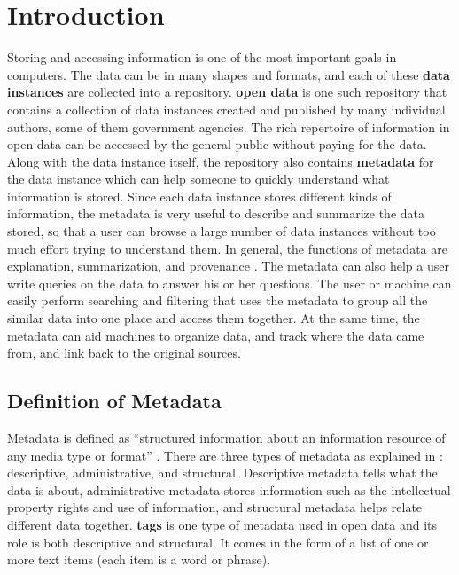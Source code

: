 
\chapter{Introduction}
\label{ch:Introduction}

Storing and accessing information is one of the most important goals in computers. The data can be in many shapes and formats, and each of these \textbf{\glspl{data instance}} are collected into a repository. \textbf{\Gls{open data}} is one such repository that contains a collection of data instances created and published by many individual authors, some of them government agencies. The rich repertoire of information in open data can be accessed by the general public without paying for the data. Along with the data instance itself, the repository also contains \textbf{\gls{metadata}} for the data instance which can help someone to quickly understand what information is stored. Since each data instance stores different kinds of information, the metadata is very useful to describe and summarize the data stored, so that a user can browse a large number of data instances without too much effort trying to understand them. In general, the functions of metadata are explanation, summarization, and provenance \cite{10.1145/2845915}. The metadata can also help a user write queries on the data to answer his or her questions. The user or machine can easily perform searching and filtering that uses the metadata to group all the similar data into one place and access them together. At the same time, the metadata can aid machines to organize data, and track where the data came from, and link back to the original sources.

\section{Definition of Metadata}
\label{sec:DefinitionOfMetadata}

Metadata is defined as “structured information about an information resource of any media type or format” \cite{Feltner2023Metadata}. There are three types of metadata as explained in \cite{Baca2008}: descriptive, administrative, and structural. Descriptive metadata tells what the data is about, administrative metadata stores information such as the intellectual property rights and use of information, and structural metadata helps relate different data together. \textbf{\Glspl{tag}} is one type of metadata used in open data and its role is both descriptive and structural. It comes in the form of a list of one or more text items (each item is a word or phrase).

